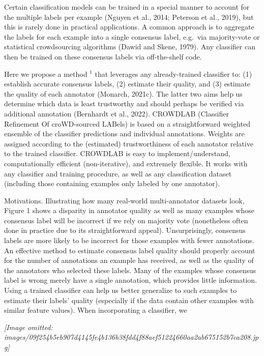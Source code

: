 \documentclass[
]{article}
\newcounter{none} %
\begin{document}
Certain classification models can be trained in a special manner to
account for the multiple labels per example (Nguyen et al., 2014;
Peterson et al., 2019), but this is rarely done in practical
applications. A common approach is to aggregate the labels for each
example into a single consensus label, e.g.~via majority-vote or
statistical crowdsourcing algorithms (Dawid and Skene, 1979). Any
classifier can then be trained on these consensus labels via
off-the-shelf code.

Here we propose a method \(^{1}\) that leverages any already-trained
classifier to: (1) establish accurate consensus labels, (2) estimate
their quality, and (3) estimate the quality of each annotator (Monarch,
2021c). The latter two aims help us determine which data is least
trustworthy and should perhaps be verified via additional annotation
(Bernhardt et al., 2022). CROWDLAB (Classifier Refinement Of
croWD-sourced LABels) is based on a straightforward weighted ensemble of
the classifier predictions and individual annotations. Weights are
assigned according to the (estimated) trustworthiness of each annotator
relative to the trained classifier. CROWDLAB is easy to
implement/understand, computationally efficient (non-iterative), and
extremely flexible. It works with any classifier and training procedure,
as well as any classification dataset (including those containing
examples only labeled by one annotator).

Motivations. Illustrating how many real-world multi-annotator datasets
look, Figure 1 shows a disparity in annotator quality as well as many
examples whose consensus label will be incorrect if we rely on majority
vote (nonetheless often done in practice due to its straightforward
appeal). Unsurprisingly, consensus labels are more likely to be
incorrect for those examples with fewer annotations. An effective method
to estimate consensus label quality should properly account for the
number of annotations an example has received, as well as the quality of
the annotators who selected these labels. Many of the examples whose
consensus label is wrong merely have a single annotation, which provides
little information. Using a trained classifier can help us better
generalize to such examples to estimate their labels' quality
(especially if the data contain other examples with similar feature
values). When incorporating a classifier, we

\textit{[Image omitted: images/09f254b5eb907d4145fe4b136b38fdd4f88aef51224660aa2ab675152b7ca208.jpg]}
\end{document}
